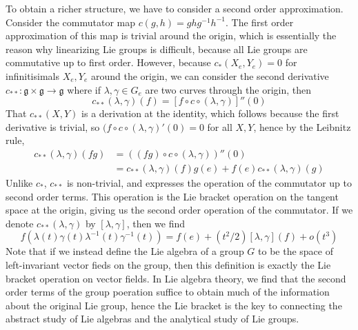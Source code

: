 To obtain a richer structure, we have to consider a second order approximation. Consider the commutator map $c(g,h) = ghg^{-1}h^{-1}$. The first order approximation of this map is trivial around the origin, which is essentially the reason why linearizing Lie groups is difficult, because all Lie groups are commutative up to first order. However, because $c_*(X_e, Y_e) = 0$ for infinitisimals $X_e, Y_e$ around the origin, we can consider the second derivative $c_{**}: \mathfrak{g} \times \mathfrak{g} \to \mathfrak{g}$ where if $\lambda, \gamma \in G_e$ are two curves through the origin, then
%
\[ c_{**}(\lambda,\gamma)(f) = [f \circ c \circ (\lambda, \gamma)]''(0) \]
%
That $c_{**}(X,Y)$ is a derivation at the identity, which follows because the first derivative is trivial, so $(f \circ c \circ (\lambda, \gamma)'(0) = 0$ for all $X,Y$, hence by the Leibnitz rule,
%
\begin{align*}
    c_{**}(\lambda, \gamma)(fg) &= ((fg) \circ c \circ (\lambda, \gamma))''(0)\\
    &= c_{**}(\lambda, \gamma)(f) g(e) + f(e) c_{**}(\lambda, \gamma)(g)
\end{align*}
%
Unlike $c_*$, $c_{**}$ is non-trivial, and expresses the operation of the commutator up to second order terms. This operation is the Lie bracket operation on the tangent space at the origin, giving us the second order operation of the commutator. If we denote $c_{**}(\lambda,\gamma)$ by $[\lambda,\gamma]$, then we find
%
\[ f(\lambda(t) \gamma(t) \lambda^{-1}(t) \gamma^{-1}(t)) = f(e) + (t^2/2) [\lambda, \gamma](f) + o(t^3) \]
%
Note that if we instead define the Lie algebra of a group $G$ to be the space of left-invariant vector fieds on the group, then this definition is exactly the Lie bracket operation on vector fields. In Lie algebra theory, we find that the second order terms of the group poeration suffice to obtain much of the information about the original Lie group, hence the Lie bracket is the key to connecting the abstract study of Lie algebras and the analytical study of Lie groups.

